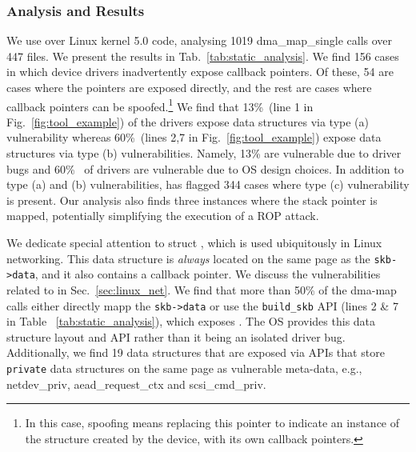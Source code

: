 \subsubsection{Analysis and Results}
We use \tool over Linux kernel 5.0 code,
analysing 1019 dma\_map\_single calls over 447 files. We present the results in Tab.~\ref{tab:static_analysis}. 
We find 156 cases in which device drivers inadvertently expose callback pointers. Of these, 54 are cases where the pointers are exposed directly, and the rest are cases where callback pointers can be spoofed.\footnote{In this case, spoofing means replacing this pointer to indicate an instance of the structure created by the device, with its own callback pointers.}
We find that 13\%~(line 1 in Fig.~\ref{fig:tool_example}) of the drivers expose data structures via type (a) vulnerability whereas 60\%~(lines 2,7 in Fig.~\ref{fig:tool_example}) expose data structures via type (b) vulnerabilities. Namely, 13\% are vulnerable due to driver bugs and 60\%~ of drivers are vulnerable due to OS design choices. In addition to type (a) and (b) vulnerabilities, \tool has flagged 344 cases where type (c) vulnerability is present. Our analysis also finds three instances where the stack pointer is mapped, potentially simplifying the execution of a ROP attack.

We dedicate special attention to struct \shinfo, which is used ubiquitously in Linux networking. This data structure is \textit{always} located on the same page as the \texttt{skb->data}, and it also contains a callback pointer. We discuss the vulnerabilities related to \shinfo in Sec.~\ref{sec:linux_net}. We find that more than 50\% of the dma-map calls either directly mapp the \texttt{skb->data} or use the \texttt{build\_skb} API (lines 2 \& 7 in Table ~\ref{tab:static_analysis}), which exposes \shinfo. The OS provides this data structure layout and API rather than it being an isolated driver bug. Additionally, we find 19 data structures that are exposed via APIs that store \texttt{private} data structures on the same page as vulnerable meta-data, e.g., netdev\_priv, aead\_request\_ctx and scsi\_cmd\_priv.




